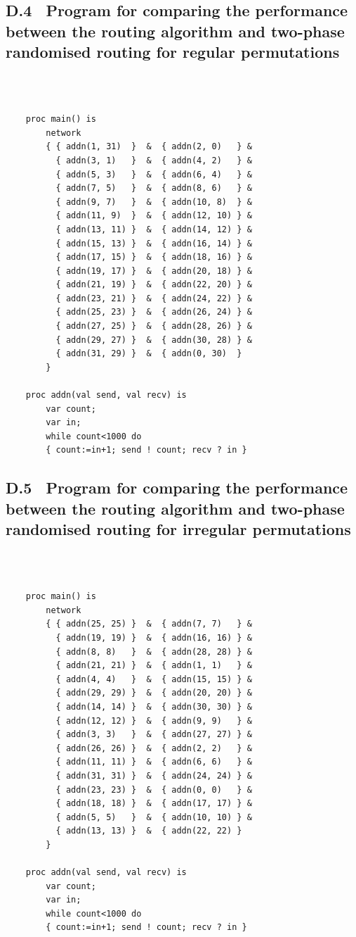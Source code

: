\documentclass[a4paper, 12pt]{article}
\begin{document}
\newpage
\subsection*{D.4 \ Program for comparing the performance between the routing algorithm and two-phase randomised routing for regular permutations}
\ 
\begin{lstlisting}

    proc main() is
        network
        { { addn(1, 31)  }  &  { addn(2, 0)   } &
          { addn(3, 1)   }  &  { addn(4, 2)   } &
          { addn(5, 3)   }  &  { addn(6, 4)   } &
          { addn(7, 5)   }  &  { addn(8, 6)   } &
          { addn(9, 7)   }  &  { addn(10, 8)  } &
          { addn(11, 9)  }  &  { addn(12, 10) } &
          { addn(13, 11) }  &  { addn(14, 12) } &
          { addn(15, 13) }  &  { addn(16, 14) } &
          { addn(17, 15) }  &  { addn(18, 16) } &
          { addn(19, 17) }  &  { addn(20, 18) } &
          { addn(21, 19) }  &  { addn(22, 20) } &
          { addn(23, 21) }  &  { addn(24, 22) } &
          { addn(25, 23) }  &  { addn(26, 24) } &
          { addn(27, 25) }  &  { addn(28, 26) } &
          { addn(29, 27) }  &  { addn(30, 28) } &
          { addn(31, 29) }  &  { addn(0, 30)  }
        }

    proc addn(val send, val recv) is 
        var count;
        var in;
        while count<1000 do
        { count:=in+1; send ! count; recv ? in }

\end{lstlisting}

\newpage
\subsection*{D.5 \ Program for comparing the performance between the routing algorithm and two-phase randomised routing for irregular permutations}
\ 
\begin{lstlisting}

    proc main() is
        network
        { { addn(25, 25) }  &  { addn(7, 7)   } &
          { addn(19, 19) }  &  { addn(16, 16) } &
          { addn(8, 8)   }  &  { addn(28, 28) } &
          { addn(21, 21) }  &  { addn(1, 1)   } &
          { addn(4, 4)   }  &  { addn(15, 15) } &
          { addn(29, 29) }  &  { addn(20, 20) } &
          { addn(14, 14) }  &  { addn(30, 30) } &
          { addn(12, 12) }  &  { addn(9, 9)   } &
          { addn(3, 3)   }  &  { addn(27, 27) } &
          { addn(26, 26) }  &  { addn(2, 2)   } &
          { addn(11, 11) }  &  { addn(6, 6)   } &
          { addn(31, 31) }  &  { addn(24, 24) } &
          { addn(23, 23) }  &  { addn(0, 0)   } &
          { addn(18, 18) }  &  { addn(17, 17) } &
          { addn(5, 5)   }  &  { addn(10, 10) } &
          { addn(13, 13) }  &  { addn(22, 22) }
        }

    proc addn(val send, val recv) is 
        var count;
        var in;
        while count<1000 do
        { count:=in+1; send ! count; recv ? in }

\end{lstlisting}
\end{document}
